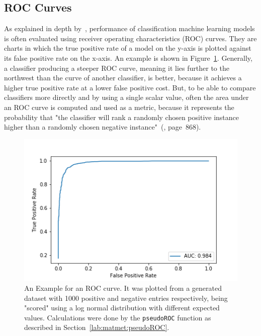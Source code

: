 	\subsection{ROC Curves}
	\label{lab:background:roc}
	As explained in depth by~\citet{Fawcett2006}, performance of classification machine learning models is often evaluated using receiver operating characteristics (ROC) curves. They are charts in which the true positive rate of a model on the y-axis is plotted against its false positive rate on the x-axis. An example is shown in Figure~\ref{fig:roc_example}. Generally, a classifier producing a steeper ROC curve, meaning it lies further to the northwest than the curve of another classifier, is better, because it achieves a higher true positive rate at a lower false positive cost. But, to be able to compare classifiers more directly and by using a single scalar value, often the area under an ROC curve is computed and used as a metric, because it represents the probability that "the classifier will rank a randomly chosen positive instance higher than a randomly chosen negative instance"~(\cite{Fawcett2006}, page~868).
	\renewcommand{\baselinestretch}{0.9}
	\begin{figure}
		\normalsize
		\centering
		\includegraphics[width = \textwidth]{figures/ROC.png}
		\caption[Example of an ROC curve]{An Example for an ROC curve. It was plotted from a generated dataset with 1000 positive and negative entries respectively, being "scored" using a log normal distribution with different expected values. Calculations were done by the \texttt{pseudoROC} function as described in Section~\ref{lab:matmet:pseudoROC}.}
		\label{fig:roc_example}
	\end{figure}
	\renewcommand{\baselinestretch}{1}\\
